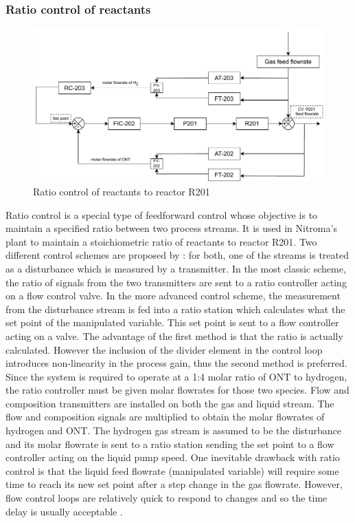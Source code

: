 \subsubsection{Ratio control of reactants} %
    \begin{figure}[h]
    \centering
    \includegraphics[width=\linewidth]{chapters/4-operation-control/4-Figures/R201-FC.pdf}
    \caption{Ratio control of reactants to reactor R201}
    \label{fig:R201-FC}
    \end{figure} 
Ratio control is a special type of feedforward control whose objective is to maintain a specified ratio between two process streams. It is used in Nitroma's plant to maintain a stoichiometric ratio of reactants to reactor R201. Two different control schemes are proposed by \textcite{seborg_process_2011}: for both, one of the streams is treated as a disturbance which is measured by a transmitter. In the most classic scheme, the ratio of signals from the two transmitters are sent to a ratio controller acting on a flow control valve. In the more advanced control scheme, the measurement from the disturbance stream is fed into a ratio station which calculates what the set point of the manipulated variable. This set point is sent to a flow controller acting on a valve. The advantage of the first method is that the ratio is actually calculated. However the inclusion of the divider element in the control loop introduces non-linearity in the process gain, thus the second method is preferred. Since the system is required to operate at a 1:4 molar ratio of ONT to hydrogen, the ratio controller must be given molar flowrates for those two species. Flow and composition transmitters are installed on both the gas and liquid stream. The flow and composition signals are multiplied to obtain the molar flowrates of hydrogen and ONT. The hydrogen gas stream is assumed to be the disturbance and its molar flowrate is sent to a ratio station sending the set point to a flow controller acting on the liquid pump speed. One inevitable drawback with ratio control is that the liquid feed flowrate (manipulated variable) will require some time to reach its new set point after a step change in the gas flowrate. However, flow control loops are relatively quick to respond to changes and so the time delay is usually acceptable \cite{seborg_process_2011}.





